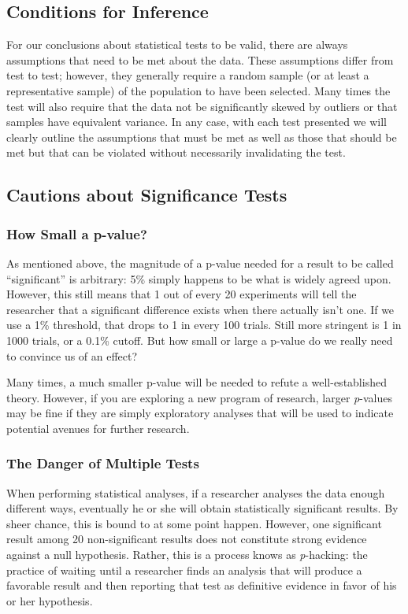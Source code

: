 \subsection{Conditions for Inference}
For our conclusions about statistical tests to be valid, there are always assumptions that need to be met about the data. These assumptions differ from test to test; however, they generally require a random sample (or at least a representative sample) of the population to have been selected. Many times the test will also require that the data not be significantly skewed by outliers or that samples have equivalent variance. In any case, with each test presented we will clearly outline the assumptions that must be met as well as those that should be met but that can be violated without necessarily invalidating the test.

\subsection{Cautions about Significance Tests}
\subsubsection{How Small a p-value?}
As mentioned above, the magnitude of a p-value needed for a result to be called ``significant'' is arbitrary: 5\% simply happens to be what is widely agreed upon. However, this still means that 1 out of every 20 experiments will tell the researcher that a significant difference exists when there actually isn't one. If we use a 1\% threshold, that drops to 1 in every 100 trials. Still more stringent is 1 in 1000 trials, or a 0.1\% cutoff. But how small or large a p-value do we really need to convince us of an effect?

Many times, a much smaller p-value will be needed to refute a well-established theory. However, if you are exploring a new program of research, larger \textit{p}-values may be fine if they are simply exploratory analyses that will be used to indicate potential avenues for further research.

\subsubsection{The Danger of Multiple Tests}
When performing statistical analyses, if a researcher analyses the data enough different ways, eventually he or she will obtain statistically significant results. By sheer chance, this is bound to at some point happen. However, one significant result among 20 non-significant results does not constitute strong evidence against a null hypothesis. Rather, this is a process knows as \textit{p}-hacking: the practice of waiting until a researcher finds an analysis that will produce a favorable result and then reporting that test as definitive evidence in favor of his or her hypothesis.

